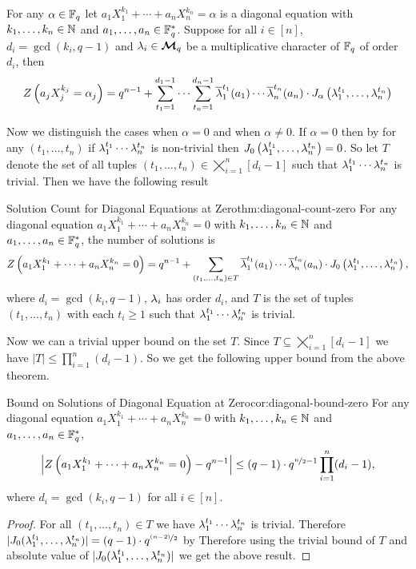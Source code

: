 \begin{observation}\label{obs:diagonal-jacobi-formula}
  For any $\alpha\in\mathbb{F}_q$ let $a_1X_1^{k_1}+\cdots+a_nX_n^{k_n}=\alpha$ is a diagonal equation with $k_1,\dots,k_n\in\mathbb{N}$ and $a_1,\dots,a_n\in\mathbb{F}_q^*$. Suppose for all $i\in[n]$, $d_i=\gcd(k_i,q-1)$ and $\lambda_i\in\boldsymbol{\mathcal{M}}_q$ be a multiplicative character of $\mathbb{F}_q$ of order $d_i$, then \begin{equation}\label{eq:diagonal-solutions}
    Z\left( a_jX_j^{k_j}=\alpha_j\right)=q^{n-1}+\sum_{t_1=1}^{d_1-1}\cdots \sum_{t_n=1}^{d_n-1}\overline{\lambda}_1^{t_1}(a_1)\cdots\overline{\lambda}_n^{t_n}(a_n) \cdot J_{\alpha}\left(\lambda_1^{t_1},\dots, \lambda_n^{t_n}\right)
  \end{equation}
\end{observation}

Now we distinguish the cases when $\alpha=0$ and when $\alpha\neq 0$. If $\alpha=0$ then by \JacZeroRellem[(i)] for any $(t_1,\dots, t_n)$ if $\lambda_1^{t_1}\cdots \lambda_n^{t_n}$ is non-trivial then $J_0\left(\lambda_1^{t_1},\dots ,\lambda_n^{t_n}\right)=0$. So let $T$ denote the set of all tuples $(t_1,\dots, t_n)\in \bigtimes_{i=1}^n [d_i-1]$ such that $\lambda_1^{t_1}\cdots \lambda_n^{t_n}$ is trivial. Then we have the following result
\begin{Theorem}{Solution Count for Diagonal Equations at Zero}{thm:diagonal-count-zero}
  For any diagonal equation $a_1X_1^{k_1}+\cdots+a_nX_n^{k_n}=0$ with $k_1,\dots,k_n\in\mathbb{N}$ and $a_1,\dots,a_n\in\mathbb{F}_q^*$, the number of solutions is $$Z\left(a_1X_1^{k_1}+\cdots+a_nX_n^{k_n}=0\right)=q^{n-1}+\sum_{(t_1,\dots, t_n)\in T}\overline{\lambda}_1^{t_1}(a_1)\cdots\overline{\lambda}_n^{t_n}(a_n) \cdot J_0\left(\lambda_1^{t_1},\dots, \lambda_n^{t_n}\right),$$where $d_i=\gcd(k_i,q-1)$, $\lambda_i$ has order $d_i$, and $T$ is the set of tuples $(t_1,\dots,t_n)$ with each $t_i\geq 1$ such that $\lambda_1^{t_1}\cdots\lambda_n^{t_n}$ is trivial.
\end{Theorem}
Now we can a trivial upper bound on the set $T$. Since $T\subseteq \bigtimes_{i=1}^n [d_i-1]$ we have $|T|\leq \prod_{i=1}^n (d_i-1)$. So we get the following upper bound from the above theorem.
\begin{corolary}{Bound on Solutions of Diagonal Equation at Zero}{cor:diagonal-bound-zero}
  For any diagonal equation $a_1X_1^{k_1}+\cdots+a_nX_n^{k_n}=0$ with $k_1,\dots,k_n\in\mathbb{N}$ and $a_1,\dots,a_n\in\mathbb{F}_q^*$, $$\left|Z\left(a_1X_1^{k_1}+\cdots+a_nX_n^{k_n}=0\right)-q^{n-1}\right|\leq (q-1)\cdot q^{\nicefrac{n}{2}-1}\prod_{i=1}^n(d_i-1),$$where $d_i=\gcd(k_i,q-1)$ for all $i\in[n]$.
\end{corolary}
\begin{proof}
  For all $(t_1,\dots, t_n)\in T$ we have $\lambda_1^{t_1}\cdots \lambda_n^{t_n}$ is trivial. Therefore $|J_0(\lambda_1^{t_1},\dots, \lambda_n^{t_n})|=(q-1)\cdot q^{\nicefrac{(n-2)}{2}}$ by \JacobiCompletethm[(iv)] Therefore using the trivial bound of $T$ and absolute value of $|J_0(\lambda_1^{t_1},\dots, \lambda_n^{t_n})|$ we get the above result. 
\end{proof}

